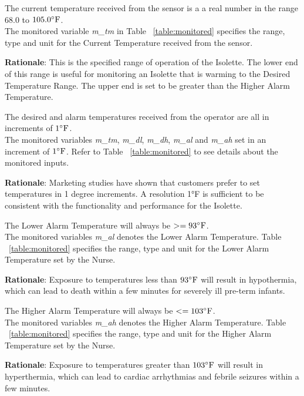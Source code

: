 \documentclass[fontsize=12pt,paper=letter,twoside]{scrartcl}
\begin{document}
\edescription
{The current temperature received from the sensor is a a real number in the range $68.0$ to $105.0 ^{\circ}\mathrm{F}$.\\}
{The monitored variable \emph{m\_tm} in Table ~\ref{table:monitored} specifies the range, type and unit for the Current Temperature received from the sensor.}
\label{E1}

\smallskip
\noindent \textbf{Rationale}: This is the specified range of operation of the Isolette. The lower end of this range is useful for monitoring an Isolette that is warming to the Desired Temperature Range. The upper end is set to be greater than the Higher Alarm Temperature.

\edescription
{The desired and alarm temperatures received from the operator are all in increments of $1 ^{\circ}\mathrm{F}$.\\}
{The monitored variables \emph{m\_tm}, \emph{m\_dl}, \emph{m\_dh}, \emph{m\_al} and \emph{m\_ah} set in an increment of $1 ^{\circ}\mathrm{F}$. Refer to Table ~\ref{table:monitored} to see details about the monitored inputs.}
\label{E2}

\smallskip
\noindent \textbf{Rationale}: Marketing studies have shown that customers prefer to set temperatures in 1 degree increments. A resolution 1°F is sufficient to be consistent with the functionality and performance for the Isolette.

\edescription
{The Lower Alarm Temperature will always be $ >= 93^{\circ}\mathrm{F}$.\\}
{The monitored variables \emph{m\_al} denotes the Lower Alarm Temperature. Table ~\ref{table:monitored} specifies the range, type and unit for the Lower Alarm Temperature set by the Nurse.}
\label{E3}

\smallskip
\noindent \textbf{Rationale}: Exposure to temperatures less than $93^{\circ}\mathrm{F}$ will result in hypothermia, which can lead to death within a few minutes for severely ill pre-term infants.

\edescription
{The Higher Alarm Temperature will always be $ <= 103^{\circ}\mathrm{F}$.\\}
{The monitored variables \emph{m\_ah} denotes the Higher Alarm Temperature. Table ~\ref{table:monitored} specifies the range, type and unit for the Higher Alarm Temperature set by the Nurse.}
\label{E4}

\smallskip
\noindent \textbf{Rationale}: Exposure to temperatures greater than $103^{\circ}\mathrm{F}$ will result in hyperthermia, which can lead to cardiac arrhythmias and febrile seizures within a few minutes.
\end{document}
